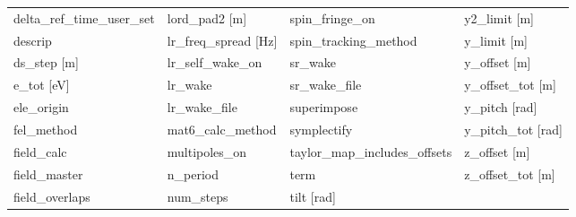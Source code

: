 \begin{tabular}{llll}
delta_ref_time_user_set          & lord_pad2 [m]                    & spin_fringe_on                   & y2_limit [m]                     \\
descrip                          & lr_freq_spread [Hz]              & spin_tracking_method             & y_limit [m]                      \\
ds_step [m]                      & lr_self_wake_on                  & sr_wake                          & y_offset [m]                     \\
e_tot [eV]                       & lr_wake                          & sr_wake_file                     & y_offset_tot [m]                 \\
ele_origin                       & lr_wake_file                     & superimpose                      & y_pitch [rad]                    \\
fel_method                       & mat6_calc_method                 & symplectify                      & y_pitch_tot [rad]                \\
field_calc                       & multipoles_on                    & taylor_map_includes_offsets      & z_offset [m]                     \\
field_master                     & n_period                         & term                             & z_offset_tot [m]                 \\
field_overlaps                   & num_steps                        & tilt [rad]                       &                                  \\
 \bottomrule
 \end{tabular}
 \vfill
 
